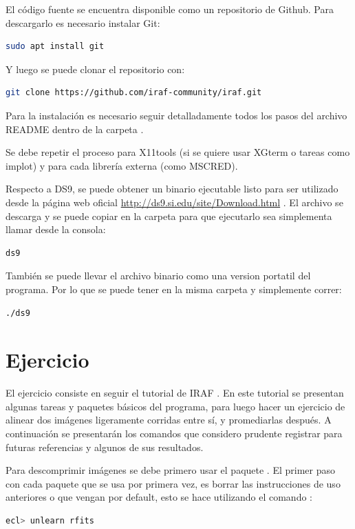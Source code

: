 \documentclass[12pt]{article}
\begin{document}
El código fuente se encuentra disponible como un repositorio de Github. Para descargarlo es necesario instalar Git:
\begin{lstlisting}[language=bash]
sudo apt install git
\end{lstlisting}
Y luego se puede clonar el repositorio con:
\begin{lstlisting}[language=bash]
git clone https://github.com/iraf-community/iraf.git
\end{lstlisting}

Para la instalación es necesario seguir detalladamente todos los pasos del archivo README dentro de la carpeta .

Se debe repetir el proceso para X11tools (si se quiere usar XGterm o tareas como implot) y para cada librería externa (como MSCRED).

Respecto a DS9, se puede obtener un binario ejecutable listo para ser utilizado desde la página web oficial \url{http://ds9.si.edu/site/Download.html} .
El archivo se descarga y se puede copiar en la carpeta  para que ejecutarlo sea simplementa llamar desde la consola:
\begin{lstlisting}[language=bash]
ds9
\end{lstlisting}
También se puede llevar el archivo binario como una version portatil del programa. Por lo que se puede tener en la misma carpeta y simplemente correr:
\begin{lstlisting}[language=bash]
./ds9
\end{lstlisting}

\section{Ejercicio}
El ejercicio consiste en seguir el tutorial de IRAF . En este tutorial se presentan algunas tareas y paquetes básicos del programa, para luego hacer un ejercicio de alinear dos imágenes ligeramente corridas entre sí, y promediarlas después.
A continuación se presentarán los comandos que considero prudente registrar para futuras referencias y algunos de sus resultados.

Para descomprimir imágenes se debe primero usar el paquete .
El primer paso con cada paquete que se usa por primera vez, es borrar las instrucciones de uso anteriores o que vengan por default, esto se hace utilizando el comando :
\begin{lstlisting}[language=bash]
ecl> unlearn rfits
\end{lstlisting}
\end{document}
